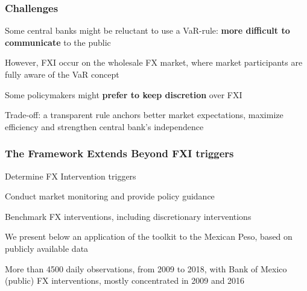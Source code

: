 \documentclass{beamer}
\newenvironment{wideitemize}{\itemize\addtolength{\itemsep}{10pt}}{\enditemize}
\newenvironment{wideenumerate}{\enumerate\addtolength{\itemsep}{10pt}}{\endenumerate}
\begin{document}
\begin{frame}
  \frametitle{Challenges}
  \begin{wideitemize}
      \item Some central banks might be reluctant to use a VaR-rule: \textbf{more
        difficult to communicate} to the public
        \begin{wideitemize}
      \item However, FXI occur on the wholesale FX market, where market
        participants are fully aware of the VaR concept
        \end{wideitemize}        
      \item Some policymakers might \textbf{prefer to keep discretion} over FXI
        \begin{wideitemize}
    \item Trade-off: a transparent rule anchors better market expectations,
      maximize efficiency and strengthen central bank's independence              
        \end{wideitemize}        
  \end{wideitemize}
\end{frame}

\begin{frame}
  \frametitle{The Framework Extends Beyond FXI triggers}    
  \begin{wideenumerate}
    \item Determine FX Intervention triggers
    \item Conduct market monitoring and provide policy guidance
    \item Benchmark FX interventions, including discretionary interventions
    \end{wideenumerate}
    
    \bigskip
    
  \begin{wideitemize}
    \item We present below an application of the toolkit to the Mexican Peso, based on publicly
      available data
    \item More than 4500 daily observations, from 2009 to 2018, with Bank of
      Mexico (public) FX interventions, mostly concentrated in 2009 and 2016
    \end{wideitemize}
    
\end{frame}


\end{document}
